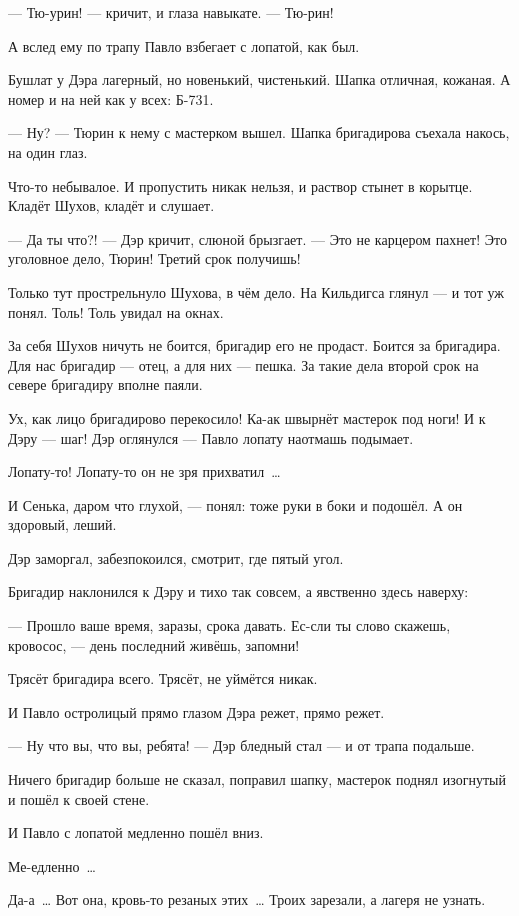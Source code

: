 --- Тю-урин! --- кричит, и глаза навыкате. --- Тю-рин!

А вслед ему по трапу Павло взбегает с лопатой, как был.

Бушлат у Дэра лагерный, но новенький, чистенький. Шапка отличная, кожаная. А номер и на ней как у всех: Б-731.

--- Ну? --- Тюрин к нему с мастерком вышел. Шапка бригадирова съехала накось, на один глаз.

Что-то небывалое. И пропустить никак нельзя, и раствор стынет в корытце. Кладёт Шухов, кладёт и слушает.

--- Да ты что?! --- Дэр кричит, слюной брызгает. --- Это не карцером пахнет! Это уголовное дело, Тюрин! Третий срок получишь!

Только тут прострельнуло Шухова, в чём дело. На Кильдигса глянул --- и тот уж понял. Толь! Толь увидал на окнах.

За себя Шухов ничуть не боится, бригадир его не продаст. Боится за бригадира. Для нас бригадир --- отец, а для них --- пешка. За такие дела второй срок на севере бригадиру вполне паяли.

Ух, как лицо бригадирово перекосило! Ка-ак швырнёт мастерок под ноги! И к Дэру --- шаг! Дэр оглянулся --- Павло лопату наотмашь подымает.

Лопату-то! Лопату-то он не зря прихватил~\dots{}

И Сенька, даром что глухой, --- понял: тоже руки в боки и подошёл. А он здоровый, леший.

Дэр заморгал, забезпокоился, смотрит, где пятый угол.

Бригадир наклонился к Дэру и тихо так совсем, а явственно здесь наверху:

--- Прошло ваше время, заразы, срока давать. Ес-сли ты слово скажешь, кровосос, --- день последний живёшь, запомни!

Трясёт бригадира всего. Трясёт, не уймётся никак.

И Павло остролицый прямо глазом Дэра режет, прямо режет.

--- Ну что вы, что вы, ребята! --- Дэр бледный стал --- и от трапа подальше.

Ничего бригадир больше не сказал, поправил шапку, мастерок поднял изогнутый и пошёл к своей стене.

И Павло с лопатой медленно пошёл вниз.

Ме-едленно~\dots{}

Да-а~\dots{} Вот она, кровь-то резаных этих~\dots{} Троих зарезали, а лагеря не узнать.

